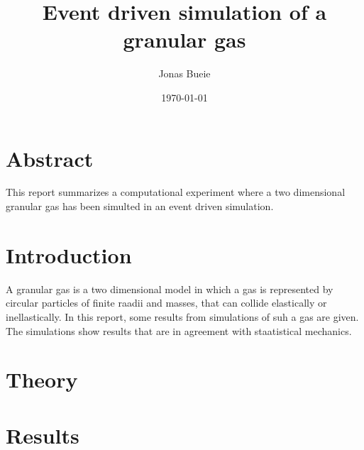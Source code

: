 \documentclass{article}
\title{Event driven simulation of a granular gas}
\author{Jonas Bueie}
\date{\today}
\begin{document}
\large
\maketitle

\noindent \hrulefill
\section*{Abstract}

This report summarizes a computational experiment where a two dimensional granular gas has been simulted in an event driven simulation.

\noindent \hrulefill

\begin{multicols}{2}
\section{Introduction}

A granular gas is a two dimensional model in which a gas is represented by circular particles of finite raadii and masses, that can collide elastically or inellastically.
In this report, some results from simulations of suh a gas are given.
The simulations show results that are in agreement with staatistical mechanics.

\section{Theory}

\section{Results}




\end{multicols}
\end{document}
